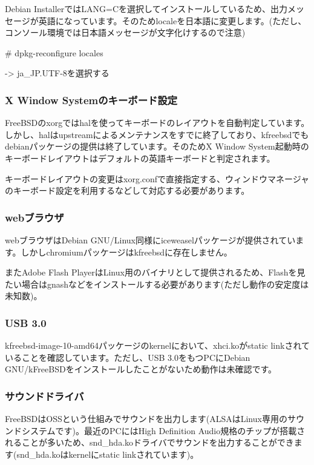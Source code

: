 \documentclass[mingoth,a4paper]{jsarticle}
\begin{document}
Debian InstallerではLANG=Cを選択してインストールしているため、出力メッセージが英語になっています。そのためlocaleを日本語に変更します。(ただし、コンソール環境では日本語メッセージが文字化けするので注意)

\begin{commandline}
  # dpkg-reconfigure locales

  -> ja_JP.UTF-8を選択する
\end{commandline}

\subsubsection{X Window Systemのキーボード設定}

FreeBSDのxorgではhalを使ってキーボードのレイアウトを自動判定しています。しかし、halはupstreamによるメンテナンスをすでに終了しており、kfreebsdでもdebianパッケージの提供は終了しています。そのためX Window System起動時のキーボードレイアウトはデフォルトの英語キーボードと判定されます。

キーボードレイアウトの変更はxorg.confで直接指定する、ウィンドウマネージャのキーボード設定を利用するなどして対応する必要があります。

\subsubsection{webブラウザ}

webブラウザはDebian GNU/Linux同様にiceweaselパッケージが提供されています。しかしchromiumパッケージはkfreebsdに存在しません。

またAdobe Flash PlayerはLinux用のバイナリとして提供されるため、Flashを見たい場合はgnashなどをインストールする必要があります(ただし動作の安定度は未知数)。

\subsubsection{USB 3.0}

kfreebsd-image-10-amd64パッケージのkernelにおいて、xhci.koがstatic linkされていることを確認しています。ただし、USB 3.0をもつPCにDebian GNU/kFreeBSDをインストールしたことがないため動作は未確認です。

\subsubsection{サウンドドライバ}

FreeBSDはOSSという仕組みでサウンドを出力します(ALSAはLinux専用のサウンドシステムです)。最近のPCにはHigh Definition Audio規格のチップが搭載されることが多いため、snd\_hda.koドライバでサウンドを出力することができます(snd\_hda.koはkernelにstatic linkされています)。
\end{document}
